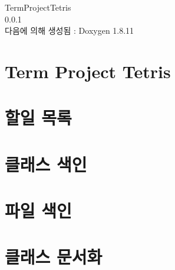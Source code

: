 \documentclass[twoside]{book}
\newcommand{\+}{\discretionary{\mbox{\scriptsize$\hookleftarrow$}}{}{}}
\newcommand{\clearemptydoublepage}{%
  \newpage{\pagestyle{empty}\cleardoublepage}%
}
\begin{document}
\hypersetup{pageanchor=false,
             bookmarksnumbered=true,
             pdfencoding=unicode
            }
\begin{titlepage}
\vspace*{7cm}
\begin{center}%
{\Large Term\+Project\+Tetris \\[1ex]\large 0.\+0.\+1 }\\
\vspace*{1cm}
{\large 다음에 의해 생성됨 \+:  Doxygen 1.8.11}\\
\end{center}
\end{titlepage}
\clearemptydoublepage
\tableofcontents
\clearemptydoublepage
{}
\hypersetup{pageanchor=true}

\chapter{Term Project Tetris}
\label{index}\hypertarget{index}{}
\chapter{할일 목록}
\label{todo}
\hypertarget{todo}{}

\chapter{클래스 색인}

\chapter{파일 색인}

\chapter{클래스 문서화}



\end{document}
